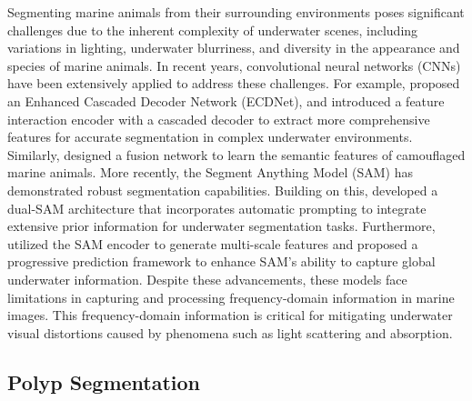 Segmenting marine animals from their surrounding environments poses significant challenges due to the inherent complexity of underwater scenes, including variations in lighting, underwater blurriness, and diversity in the appearance and species of marine animals. In recent years, convolutional neural networks (CNNs) have been extensively applied to address these challenges. For example, \cite{ECDNet} proposed an Enhanced Cascaded Decoder Network (ECDNet), and \cite{Marine_Related_2} introduced a feature interaction encoder with a cascaded decoder to extract more comprehensive features for accurate segmentation in complex underwater environments. Similarly, \cite{MASNet} designed a fusion network to learn the semantic features of camouflaged marine animals.
More recently, the Segment Anything Model (SAM) has demonstrated robust segmentation capabilities. Building on this, \cite{Dual-SAM} developed a dual-SAM architecture that incorporates automatic prompting to integrate extensive prior information for underwater segmentation tasks. Furthermore, \cite{MAS-SAM} utilized the SAM encoder to generate multi-scale features and proposed a progressive prediction framework to enhance SAM’s ability to capture global underwater information.
Despite these advancements, these models face limitations in capturing and processing frequency-domain information in marine images. This frequency-domain information is critical for mitigating underwater visual distortions caused by phenomena such as light scattering and absorption.

\subsection{Polyp Segmentation}


